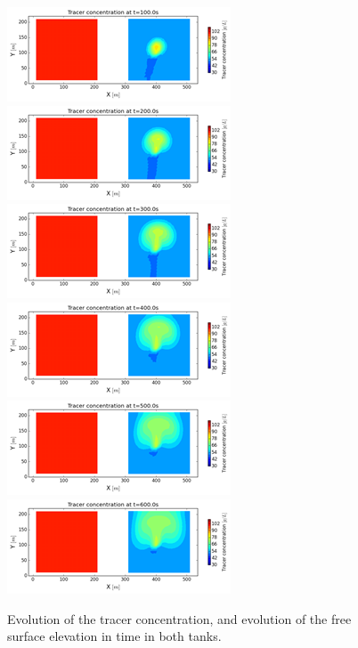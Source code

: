 \begin{figure}
\centering
\includegraphics{img/image92}
\includegraphics{img/image93}
\includegraphics{img/image94}
\includegraphics{img/image95}
\includegraphics{img/image96}
\includegraphics{img/image97}
 \caption{Evolution of the tracer concentration, and evolution of the free surface elevation in time in both tanks.}\label{fig:siphon:evolbis}
\end{figure}

